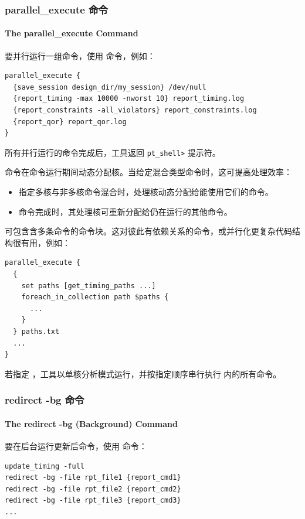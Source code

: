 \subsubsection{parallel\_execute 命令}
\paragraph*{The parallel\_execute Command}

要并行运行一组命令，使用  命令，例如：
\begin{lstlisting}
parallel_execute {
  {save_session design_dir/my_session} /dev/null
  {report_timing -max 10000 -nworst 10} report_timing.log
  {report_constraints -all_violators} report_constraints.log
  {report_qor} report_qor.log
}
\end{lstlisting}

所有并行运行的命令完成后，工具返回 \texttt{pt\_shell>} 提示符。

 命令在命令运行期间动态分配核。当给定混合类型命令时，这可提高处理效率：
\begin{itemize}
  \item 指定多核与非多核命令混合时，处理核动态分配给能使用它们的命令。
  \item 命令完成时，其处理核可重新分配给仍在运行的其他命令。
\end{itemize}

可包含含多条命令的命令块。这对彼此有依赖关系的命令，或并行化更复杂代码结构很有用，例如：
\begin{lstlisting}
parallel_execute {
  {
    set paths [get_timing_paths ...]
    foreach_in_collection path $paths {
      ...
    }
  } paths.txt
  ...
}
\end{lstlisting}

若指定 ，工具以单核分析模式运行，并按指定顺序串行执行  内的所有命令。

\subsubsection{redirect -bg 命令}
\paragraph*{The redirect -bg (Background) Command}

要在后台运行更新后命令，使用  命令：
\begin{lstlisting}
update_timing -full
redirect -bg -file rpt_file1 {report_cmd1}
redirect -bg -file rpt_file2 {report_cmd2}
redirect -bg -file rpt_file3 {report_cmd3}
...
\end{lstlisting}

